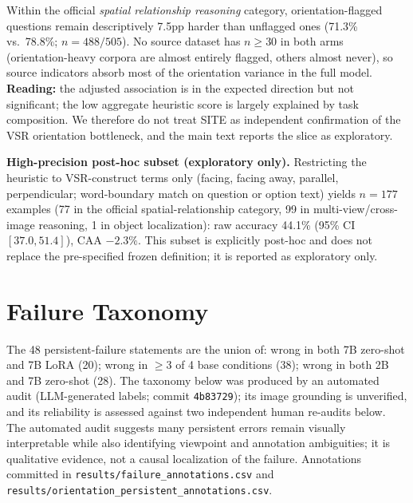 Within the official \emph{spatial relationship reasoning} category,
orientation-flagged questions remain descriptively 7.5pp harder than unflagged
ones (71.3\% vs.\ 78.8\%; $n{=}488/505$). No source dataset has $n{\ge}30$ in
both arms (orientation-heavy corpora are almost entirely flagged, others almost
never), so source indicators absorb most of the orientation variance in the
full model. \textbf{Reading:} the adjusted association is in the expected
direction but not significant; the low aggregate heuristic score is largely
explained by task composition. We therefore do not treat SITE as independent
confirmation of the VSR orientation bottleneck, and the main text reports the
slice as exploratory.

\textbf{High-precision post-hoc subset (exploratory only).} Restricting the
heuristic to VSR-construct terms only (facing, facing away, parallel,
perpendicular; word-boundary match on question or option text) yields
$n{=}177$ examples (77 in the official spatial-relationship category, 99 in
multi-view/cross-image reasoning, 1 in object localization): raw accuracy 44.1\% (95\% CI $[37.0, 51.4]$),
CAA $-2.3\%$. This subset is explicitly post-hoc and does not replace the
pre-specified frozen definition; it is reported as exploratory only.

\section{Failure Taxonomy}
\label{app:taxonomy}

The 48 persistent-failure statements are the union of: wrong in both 7B
zero-shot and 7B LoRA (20); wrong in $\geq$3 of 4 base conditions (38); wrong
in both 2B and 7B zero-shot (28). The taxonomy below was produced by an
automated audit (LLM-generated labels; commit \texttt{4b83729}); its image
grounding is unverified, and its reliability is assessed against two
independent human re-audits below. The automated audit suggests many
persistent errors remain visually interpretable while also identifying
viewpoint and annotation ambiguities; it is qualitative evidence, not a
causal localization of the failure. Annotations committed in
\texttt{results/failure\_annotations.csv} and
\texttt{results/orientation\_persistent\_annotations.csv}.

